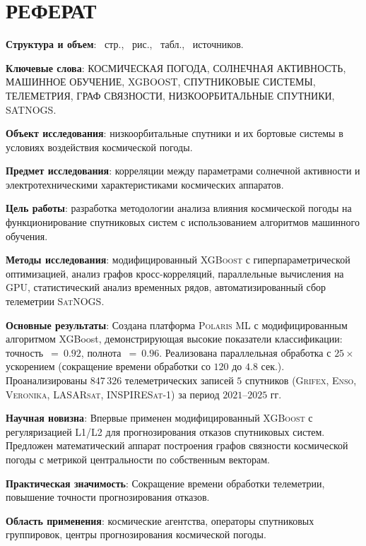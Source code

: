 \chapter*{РЕФЕРАТ}

\textbf{Структура и объем}: \maincontentpages~стр., \totalfigures~рис.,
\totaltables~табл., \thetotalsources~источников.

\textbf{Ключевые слова}: КОСМИЧЕСКАЯ ПОГОДА, СОЛНЕЧНАЯ АКТИВНОСТЬ, МАШИННОЕ
ОБУЧЕНИЕ, XGBOOST, СПУТНИКОВЫЕ СИСТЕМЫ, ТЕЛЕМЕТРИЯ, ГРАФ СВЯЗНОСТИ,
НИЗКООРБИТАЛЬНЫЕ СПУТНИКИ, SATNOGS.

\textbf{Объект исследования}: низкоорбитальные спутники и их бортовые системы в
условиях воздействия космической погоды.

\textbf{Предмет исследования}: корреляции между параметрами солнечной активности
и электротехническими характеристиками космических аппаратов.

\textbf{Цель работы}: разработка методологии анализа влияния космической погоды
на функционирование спутниковых систем с использованием алгоритмов машинного
обучения.

\textbf{Методы исследования}: модифицированный \textsc{XGBoost} с
гиперпараметрической оптимизацией, анализ графов кросс-корреляций, параллельные
вычисления на \textsc{GPU}, статистический анализ временных рядов,
автоматизированный сбор телеметрии \textsc{SatNOGS}.

\textbf{Основные результаты}: Создана платформа \textsc{Polaris ML} с 
модифицированным алгоритмом XGBoost, демонстрирующая высокие показатели 
классификации: точность~$=~0.92$, полнота~$=~0.96$. 
Реализована параллельная обработка с $25{\times}$ ускорением 
(сокращение времени обработки со $120$ до $4.8$ сек.). Проанализированы 
$847{\,}326$ телеметрических записей $5$ спутников (\textsc{Grifex}, 
\textsc{Enso}, \textsc{Veronika}, \textsc{LASARsat}, \textsc{INSPIRESat-1}) 
за период $2021$--$2025$ гг.


\textbf{Научная новизна}: Впервые применен модифицированный \textsc{XGBoost} с
регуляризацией L1/L2 для прогнозирования отказов спутниковых систем. Предложен
математический аппарат построения графов связности космической погоды с метрикой
центральности по собственным векторам.

\textbf{Практическая значимость}: Сокращение времени обработки телеметрии,
повышение точности прогнозирования отказов.

\textbf{Область применения}: космические агентства, операторы спутниковых
группировок, центры прогнозирования космической погоды.





